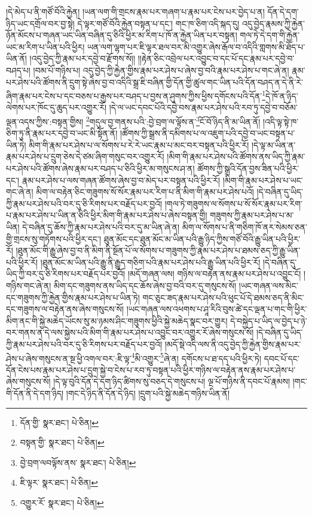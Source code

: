 །དེ་མེད་པ་ནི་གཙོ་བོའི་རྐྱེན། །ཡན་ལག་གི་གྲངས་རྣམ་པར་གཞག་པ་རྣམ་པར་ངེས་པར་བྱེད་པ་ན། དོན་དེ་དག་ཉིད་ཡང་དགྲོལ་བར་བྱ་སྟེ། དེ་ལྟར་གཙོ་བོའི་རྐྱེན་བསྟན་པ་དང་། གང་ཁ་ཅིག་འདི་སྐད་དུ། འདུ་བྱེད་རྣམས་ཀྱི་རྐྱེན་ཉོན་མོངས་པ་གཞན་ཡང་ཡིན་བཞིན་དུ་ཅིའི་ཕྱིར་མ་རིག་པ་ཁོ་ན་རྐྱེན་ཡིན་པར་བསྟན། གལ་ཏེ་དེ་དག་གི་རྐྱེན་ཡང་མ་རིག་པ་ཡིན་པའི་ཕྱིར། ཡན་ལག་ལྷག་པར་ཇི་ལྟར་ཐལ་བར་མི་འགྱུར་ཞེས་རྒོལ་བ་འདིའི་གླགས་མི་ཐོད་པ་ཡིན་ནོ། །འདུ་བྱེད་ཀྱི་རྣམ་པར་དབྱེ་བ་རྫོགས་སོ།། །།རྟེན་ཅིང་འབྲེལ་པར་འབྱུང་བ་དང་པོ་དང་རྣམ་པར་དབྱེ་བ་བཤད་པ། །བམ་པོ་གཉིས་པ། འདུ་བྱེད་ཀྱི་རྐྱེན་གྱིས་རྣམ་པར་ཤེས་པ་ཞེས་བྱ་བའི་རྣམ་པར་ཤེས་པ་གང་ཞེ་ན། རྣམ་པར་ཤེས་པའི་ཚོགས་ནི་དྲུག་སྟེ་ཞེས་བྱ་བ་འདིའི་སྒྲ་ཇི་བཞིན་གྱི་དོན་གྱི་ཚུལ་གང་ཡིན་པའི་དོན་བཤད་ན་དེ་ནི་རེ་ཞིག་རྣམ་པར་ངེས་པ་དང་བཅས་པ་རྒྱས་པར་བཤད་པ་བྱས་ན་ཤུགས་ཀྱིས་ཕྱིས་དགོངས་པའི་དོན་\footnote{དོན་གྱི་  སྣར་ཐང་།  པེ་ཅིན། }དེ་ཁོ་ན་ཉིད་ལེགས་པར་ཁོང་དུ་ཆུད་པར་འགྱུར་རོ། །དེ་ལ་ཡང་དབང་པོའི་དབྱེ་བས་རྣམ་པར་ཤེས་པའི་རབ་ཏུ་དབྱེ་བ་བཅོམ་ལྡན་འདས་ཀྱིས་:བསྟན་གྱིས། \footnote{བསྟན་གྱི་  སྣར་ཐང་།  པེ་ཅིན། }གདུལ་བྱ་གནས་པའི་:བྱེ་བྲག་ལ་ལྟོས་ན་\footnote{བྱེ་བྲག་ལབལྟོས་ནས་  སྣར་ཐང་།  པེ་ཅིན། }ངོ་བོ་ཉིད་ནི་མ་ཡིན་ནོ། །འདི་ལྟ་སྟེ་ཁ་ཅིག་ཏུ་ནི་རྣམ་པར་དབྱེ་བ་ཡང་མི་སྟོན་ནོ། །ཚོགས་ཀྱི་སྒྲས་ནི་དམིགས་པ་ལ་འཇུག་པའི་དབྱེ་བ་ཡང་བསྟན་པ་ཡིན་ཏེ། མིག་གི་རྣམ་པར་ཤེས་པ་ལ་སོགས་པ་རེ་རེ་ཡང་རྣམ་པ་མང་བར་བསྟན་པའི་ཕྱིར་རོ། །དེ་ལྟ་མ་ཡིན་ན་རྣམ་པར་ཤེས་པ་དྲུག་ཅེས་དེ་ཙམ་ཞིག་གསུང་བར་འགྱུར་རོ། །མིག་གི་རྣམ་པར་ཤེས་པའི་ཚོགས་ནས་ཡིད་ཀྱི་རྣམ་པར་ཤེས་པའི་ཚོགས་ཞེས་རྣམ་པར་བཤད་པ་ཅིའི་ཕྱིར་མ་གསུངས་ཤ་ན། ཚོགས་ཀྱི་སྒྲའི་དོན་བྱས་ཟིན་པའི་ཕྱིར་དང་། རྣམ་པར་ཤེས་པ་ལས་གཞན་ཚོགས་ཞེས་བྱ་བ་མེད་པར་བསྟན་པའི་ཕྱིར་རོ། །མིག་གི་རྣམ་པར་ཤེས་པ་ཡང་གང་ཞེ་ན། མིག་ལ་བརྟེན་ཅིང་གཟུགས་སོ་སོར་རྣམ་པར་རིག་པ་ནི་མིག་གི་རྣམ་པར་ཤེས་པའོ། །དེ་བཞིན་དུ་ཡིད་ཀྱི་རྣམ་པར་ཤེས་པའི་བར་དུ་ཅི་རིགས་པར་བརྗོད་པར་བྱའོ། །གལ་ཏེ་གཟུགས་ལ་སོགས་པ་སོ་སོར་རྣམ་པར་རིག་པ་རྣམ་པར་ཤེས་པ་ཡིན་ན་ཅིའི་ཕྱིར་མིག་གི་རྣམ་པར་ཤེས་པ་ཞེས་བསྟན་གྱི། གཟུགས་ཀྱི་རྣམ་པར་ཤེས་པ་མ་ཡིན། དེ་བཞིན་དུ་ཆོས་ཀྱི་རྣམ་པར་ཤེས་པའི་བར་དུ་མ་ཡིན་ཞེ་ན། མིག་ལ་སོགས་པ་ནི་གཅིག་ཁོ་ནར་སེམས་ཅན་གྱི་གྲངས་སུ་གཏོགས་པའི་ཕྱིར་དང་། ཐུན་མོང་དང་ཐུན་མོང་མ་ཡིན་པའི་རྒྱུ་ཉིད་ཀྱིས་གཙོ་བོའི་རྒྱུ་ཡིན་པའི་ཕྱིར་རོ། །ཐུན་མོང་གི་རྒྱུ་ཞེས་བྱ་བ་ནི་མིག་ནི་སྔོན་པོ་ལ་སོགས་པ་གཟུགས་ཀྱི་རྣམ་པར་ཤེས་པ་ཐམས་ཅད་ཀྱི་རྒྱུ་ཡིན་པའི་ཕྱིར་རོ། །ཐུན་མོང་མ་ཡིན་པའི་རྒྱུ་ནི་རྒྱུད་གཅིག་པའི་རྣམ་པར་ཤེས་པའི་རྒྱུ་ཡིན་པའི་ཕྱིར་རོ། །དེ་བཞིན་དུ་ཡིད་ཀྱི་བར་དུ་ཅི་རིགས་པར་བརྗོད་པར་བྱའོ། །མདོ་གཞན་ལས། གཉིས་ལ་བརྟེན་ནས་རྣམ་པར་ཤེས་པ་འབྱུང་ངོ། །གཉིས་གང་ཞེ་ན། མིག་དང་གཟུགས་ནས་ཡིད་དང་ཆོས་ཞེས་བྱ་བའི་བར་དུ་གསུངས་སོ། །ཡང་གཞན་ལས་མིང་དང་གཟུགས་ཀྱི་རྐྱེན་གྱིས་རྣམ་པར་ཤེས་པ་ཡིན་ཏེ། གང་ཅུང་ཟད་རྣམ་པར་ཤེས་པའི་ཕུང་པོ་དེ་ཐམས་ཅད་ནི་མིང་དང་གཟུགས་ལ་བརྟེན་ནས་ཞེས་གསུངས་སོ། །ཡང་གཞན་ལས་འཕགས་པ་ཤཱ་རིའི་བུས་ཚེ་དང་ལྡན་པ་གང་གི་ཕྱིར་མིག་ནང་གི་སྐྱེ་མཆེད་ཡོངས་སུ་མ་ཉམས་ཤིང་གཟུགས་ཕྱིའི་སྐྱེ་མཆེད་སྣང་བར་གྱུར། དེ་བསྐྱེད་པ་ཡིད་ལ་བྱེད་པ་ཉེ་བར་གནས་ན་དེ་ལས་སྐྱེས་པའི་མིག་གི་རྣམ་པར་ཤེས་པ་འབྱུང་བར་འགྱུར་རོ་ཞེས་གསུངས་སོ། །དེ་བཞིན་དུ་ཡིད་ཀྱི་རྣམ་པར་ཤེས་པའི་བར་དུ་ཅི་རིགས་པར་བརྗོད་པར་བྱའོ། །མདོ་སྡེ་འདི་ལས་ནི་འདུ་བྱེད་ཀྱི་རྐྱེན་གྱིས་རྣམ་པར་ཤེས་པ་ཞེས་གསུངས་ན་སྔ་ཕྱི་འགལ་བར་:ཇི་ལྟ་\footnote{ཇི་ལྟར་  སྣར་ཐང་།  པེ་ཅིན། }མི་འགྱུར་\footnote{འགྱུར་རོ་  སྣར་ཐང་།  པེ་ཅིན། }ཞེ་ན། དགོངས་པ་ཐ་དད་པའི་ཕྱིར་ཏེ། དབང་པོ་དང་དོན་ངེས་པས་རྣམ་པར་ཤེས་པ་དྲུག་སྐྱེ་བ་ངེས་པ་རབ་ཏུ་བསྟན་པའི་ཕྱིར་གཉིས་ལ་བརྟེན་ནས་རྣམ་པར་ཤེས་པ་ཞེས་གསུངས་སོ། །དེ་ལྟ་བུའི་དོན་དེ་དག་ཉིད་ཚིགས་སུ་བཅད་དེ་གསུངས་པ། ལྔ་པོ་གཉིས་ནི་དབང་པོ་རྣམས། །གང་གི་དོན་ནི་དེ་དག་ཉིད། །གང་དེ་ཉིད་ནི་དོན་དེ་ཉིད། །དྲུག་པའི་སྐྱེ་མཆེད་གཉིས་ཡིན་ནོ། 